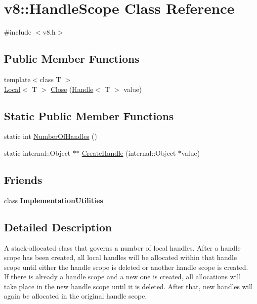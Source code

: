 \hypertarget{classv8_1_1_handle_scope}{}\section{v8\+:\+:Handle\+Scope Class Reference}
\label{classv8_1_1_handle_scope}


{\ttfamily \#include $<$v8.\+h$>$}

\subsection*{Public Member Functions}
\begin{DoxyCompactItemize}
\item 
{\footnotesize template$<$class T $>$ }\\\hyperlink{classv8_1_1_local}{Local}$<$ T $>$ \hyperlink{classv8_1_1_handle_scope_af18b68b6b149e69a05873a20c6fa269c}{Close} (\hyperlink{classv8_1_1_handle}{Handle}$<$ T $>$ value)
\end{DoxyCompactItemize}
\subsection*{Static Public Member Functions}
\begin{DoxyCompactItemize}
\item 
static int \hyperlink{classv8_1_1_handle_scope_abb2d32a75b0468885b7340404050604b}{Number\+Of\+Handles} ()
\item 
static internal\+::\+Object $\ast$$\ast$ \hyperlink{classv8_1_1_handle_scope_a93131ee7939a9bc52a62a1f370882906}{Create\+Handle} (internal\+::\+Object $\ast$value)
\end{DoxyCompactItemize}
\subsection*{Friends}
\begin{DoxyCompactItemize}
\item 
\hypertarget{classv8_1_1_handle_scope_ac7b520085953e146d849e05253267f72}{}class {\bfseries Implementation\+Utilities}\label{classv8_1_1_handle_scope_ac7b520085953e146d849e05253267f72}

\end{DoxyCompactItemize}


\subsection{Detailed Description}
A stack-\/allocated class that governs a number of local handles. After a handle scope has been created, all local handles will be allocated within that handle scope until either the handle scope is deleted or another handle scope is created. If there is already a handle scope and a new one is created, all allocations will take place in the new handle scope until it is deleted. After that, new handles will again be allocated in the original handle scope.

